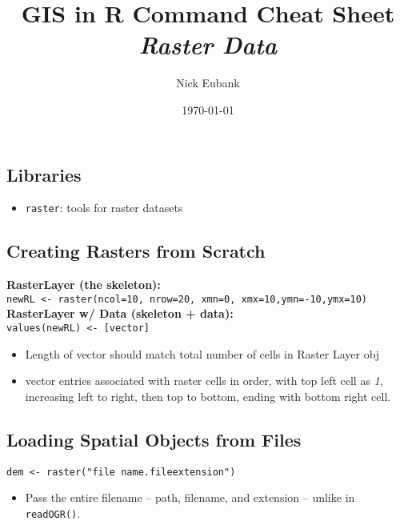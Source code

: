 \documentclass[10pt]{article}
\title{GIS in R Command Cheat Sheet \\ \emph{Raster Data}}
\date{\today}
\author{Nick Eubank}
\begin{document}
 
\maketitle

	
\hrulefill 
\subsection*{Libraries}
\begin{itemize}
	\item \texttt{raster}: tools for raster datasets
\end{itemize}


\hrulefill 
\subsection*{Creating Rasters from Scratch}
\textbf{RasterLayer (the skeleton):}\\
\hspace*{0.3cm}\texttt{newRL <- raster(ncol=10, nrow=20, xmn=0, xmx=10,ymn=-10,ymx=10)}\\
\textbf{RasterLayer w/ Data (skeleton + data):}\\
\hspace*{0.3cm}\texttt{values(newRL) <- [vector]}
\begin{itemize}
	\item Length of vector should match total number of cells in Raster Layer obj
	\item vector entries associated with raster cells in order, with top left cell as \emph{1}, increasing left to right, then top to bottom, ending with bottom right cell. 
\end{itemize}



\hrulefill
\subsection*{Loading Spatial Objects from Files}
\texttt{dem <- raster("file name.fileextension")}
\begin{itemize}
	\item Pass the entire filename  -- path, filename, and extension -- unlike in \texttt{readOGR()}.
\end{itemize}
\end{document}
